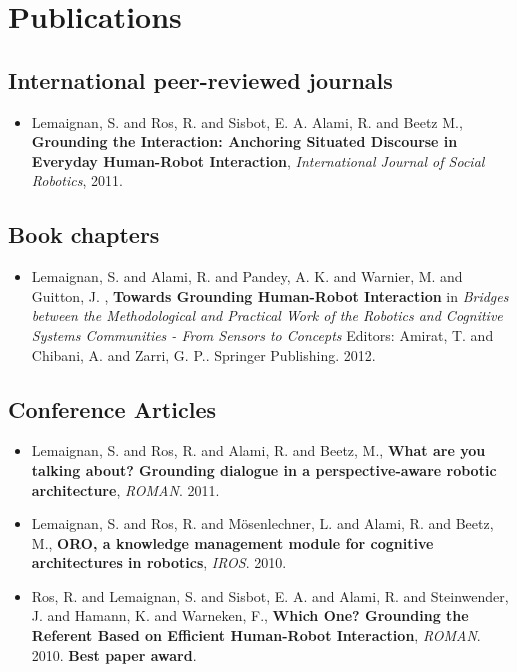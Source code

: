 \chapter{Publications}
\label{chapt|publications}

\section {International peer-reviewed journals}

\begin{itemize}
    \item{Lemaignan, S. and Ros, R. and Sisbot, E. A. Alami, R. and Beetz M., \textbf{Grounding the Interaction: Anchoring Situated Discourse in Everyday Human-Robot Interaction}, \textit{International Journal of Social Robotics}, 2011.}
\end{itemize}

\section {Book chapters}

\begin{itemize}
    \item{Lemaignan, S. and Alami, R. and Pandey, A. K. and Warnier, M. and Guitton, J. , \textbf{Towards Grounding Human-Robot Interaction} in \textit{Bridges between the Methodological and Practical Work of the Robotics and Cognitive Systems Communities - From Sensors to Concepts} Editors: Amirat, T. and Chibani, A. and Zarri, G. P.. Springer Publishing. 2012.}
\end{itemize}

\section {Conference Articles}

\begin{itemize}
    \item{Lemaignan, S. and Ros, R. and Alami, R. and Beetz, M., \textbf{What are you talking about? Grounding dialogue in a perspective-aware robotic architecture}, \textit{ROMAN}. 2011.}
    \item{Lemaignan, S. and Ros, R. and Mösenlechner, L. and Alami, R. and Beetz, M., \textbf{ORO, a knowledge management module for cognitive architectures in robotics}, \textit{IROS}. 2010.}
    \item{Ros, R. and Lemaignan, S. and Sisbot, E. A. and Alami, R. and Steinwender, J. and Hamann, K. and Warneken, F., \textbf{Which One? Grounding the Referent Based on Efficient Human-Robot Interaction}, \textit{ROMAN}. 2010. \textbf{Best paper award}.}
\end{itemize}


